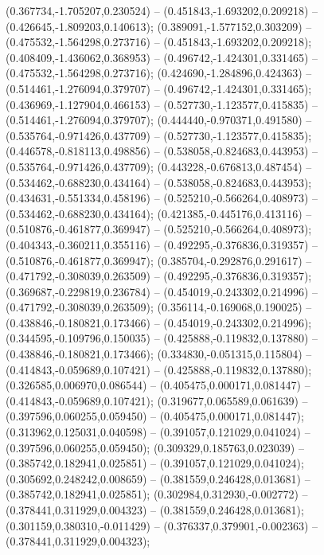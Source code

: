  (0.367734,-1.705207,0.230524) -- (0.451843,-1.693202,0.209218) -- (0.426645,-1.809203,0.140613);
 (0.389091,-1.577152,0.303209) -- (0.475532,-1.564298,0.273716) -- (0.451843,-1.693202,0.209218);
 (0.408409,-1.436062,0.368953) -- (0.496742,-1.424301,0.331465) -- (0.475532,-1.564298,0.273716);
 (0.424690,-1.284896,0.424363) -- (0.514461,-1.276094,0.379707) -- (0.496742,-1.424301,0.331465);
 (0.436969,-1.127904,0.466153) -- (0.527730,-1.123577,0.415835) -- (0.514461,-1.276094,0.379707);
 (0.444440,-0.970371,0.491580) -- (0.535764,-0.971426,0.437709) -- (0.527730,-1.123577,0.415835);
 (0.446578,-0.818113,0.498856) -- (0.538058,-0.824683,0.443953) -- (0.535764,-0.971426,0.437709);
 (0.443228,-0.676813,0.487454) -- (0.534462,-0.688230,0.434164) -- (0.538058,-0.824683,0.443953);
 (0.434631,-0.551334,0.458196) -- (0.525210,-0.566264,0.408973) -- (0.534462,-0.688230,0.434164);
 (0.421385,-0.445176,0.413116) -- (0.510876,-0.461877,0.369947) -- (0.525210,-0.566264,0.408973);
 (0.404343,-0.360211,0.355116) -- (0.492295,-0.376836,0.319357) -- (0.510876,-0.461877,0.369947);
 (0.385704,-0.292876,0.291617) -- (0.471792,-0.308039,0.263509) -- (0.492295,-0.376836,0.319357);
 (0.369687,-0.229819,0.236784) -- (0.454019,-0.243302,0.214996) -- (0.471792,-0.308039,0.263509);
 (0.356114,-0.169068,0.190025) -- (0.438846,-0.180821,0.173466) -- (0.454019,-0.243302,0.214996);
 (0.344595,-0.109796,0.150035) -- (0.425888,-0.119832,0.137880) -- (0.438846,-0.180821,0.173466);
 (0.334830,-0.051315,0.115804) -- (0.414843,-0.059689,0.107421) -- (0.425888,-0.119832,0.137880);
 (0.326585,0.006970,0.086544) -- (0.405475,0.000171,0.081447) -- (0.414843,-0.059689,0.107421);
 (0.319677,0.065589,0.061639) -- (0.397596,0.060255,0.059450) -- (0.405475,0.000171,0.081447);
 (0.313962,0.125031,0.040598) -- (0.391057,0.121029,0.041024) -- (0.397596,0.060255,0.059450);
 (0.309329,0.185763,0.023039) -- (0.385742,0.182941,0.025851) -- (0.391057,0.121029,0.041024);
 (0.305692,0.248242,0.008659) -- (0.381559,0.246428,0.013681) -- (0.385742,0.182941,0.025851);
 (0.302984,0.312930,-0.002772) -- (0.378441,0.311929,0.004323) -- (0.381559,0.246428,0.013681);
 (0.301159,0.380310,-0.011429) -- (0.376337,0.379901,-0.002363) -- (0.378441,0.311929,0.004323);
